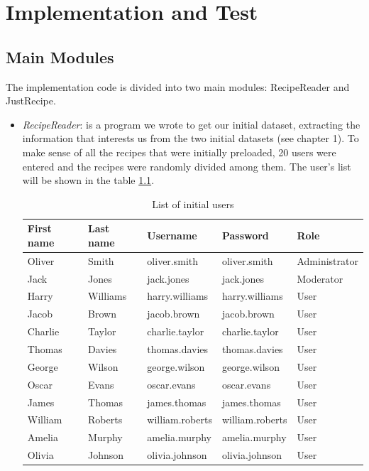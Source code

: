 \documentclass[a4paper]{report}
\begin{document}
\chapter{Implementation and Test}
\section{Main Modules}
The implementation code is divided into two main modules: RecipeReader and JustRecipe.
 \begin{itemize}
	\item \emph{RecipeReader}:  is a program we wrote to get our initial dataset, extracting the information that interests us from the two initial datasets (see chapter 1). To make sense of all the recipes that were initially preloaded, 20 users were entered and the recipes were randomly divided among them.
The user's list will be shown in the table \ref{table:list of users}.
\begin{table}[htpb]
\centering
\caption{List of initial users}
\label{table:list of users}
\begin{tabular}{|l|l|l|l|l|}
\hline
\rowcolor[HTML]{000000} 
{\color[HTML]{FFFFFF} First name} & {\color[HTML]{FFFFFF} Last name} & {\color[HTML]{FFFFFF} Username} & {\color[HTML]{FFFFFF} Password} & {\color[HTML]{FFFFFF} Role} \\ \hline
Oliver & Smith & oliver.smith & oliver.smith & Administrator \\ \hline
Jack & Jones & jack.jones & jack.jones & Moderator \\ \hline
Harry & Williams & harry.williams & harry.williams & User \\ \hline
Jacob & Brown & jacob.brown & jacob.brown & User \\ \hline
Charlie & Taylor & charlie.taylor & charlie.taylor & User \\ \hline
Thomas & Davies & thomas.davies & thomas.davies & User \\ \hline
George & Wilson & george.wilson & george.wilson & User \\ \hline
Oscar & Evans & oscar.evans & oscar.evans & User \\ \hline
James & Thomas & james.thomas & james.thomas & User \\ \hline
William & Roberts & william.roberts & william.roberts & User \\ \hline
Amelia & Murphy & amelia.murphy & amelia.murphy & User \\ \hline
Olivia & Johnson & olivia.johnson & olivia.johnson & User \\ \hline

\end{tabular}
\end{table}
\end{itemize}
\end{document}
